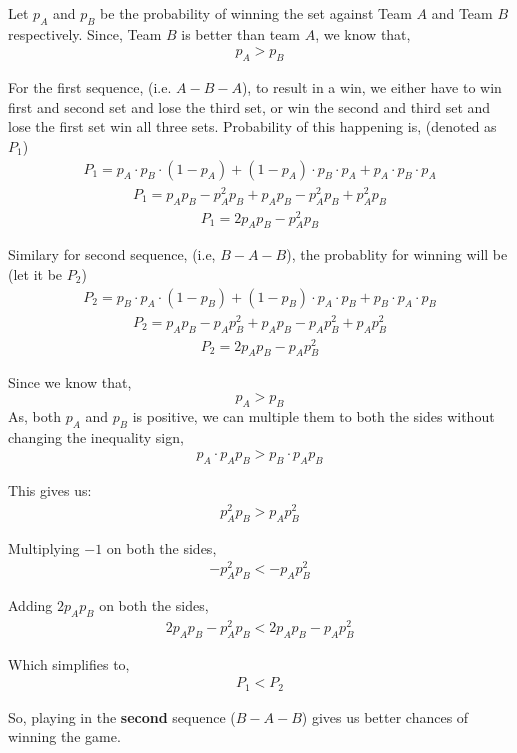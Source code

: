 \begin{tcolorbox}[breakable]
	\begin{sol}
		Let $p_A$ and $p_B$ be the probability of winning the set
		against Team $A$ and Team $B$ respectively. Since, Team $B$ is
		better than team $A$, we know that,
		\begin{align}
			p_A>p_B
		\end{align}

		For the first sequence, (i.e. $A-B-A$), to result in a win, we
		either have to win first and second set and lose the third set,
		or win the second and third set and lose the first set win all
		three sets. Probability of this happening is, (denoted as
		$P_1$)
		\begin{align}
			P_1=p_A\cdot p_B \cdot (1-p_A)+(1-p_A)\cdot p_B\cdot p_A +p_A\cdot p_B\cdot p_A
		\end{align}
		\begin{align}
			P_1=p_Ap_B-p_A^2p_B+p_Ap_B-p_A^2p_B+p_A^2p_B
		\end{align}
		\begin{align}
			P_1=2p_Ap_B-p_A^2p_B
		\end{align}

		Similary for second sequence, (i.e, $B-A-B$), the probablity for
		winning will be (let it be $P_2$)
		\begin{align}
			P_2=p_B\cdot p_A \cdot (1-p_B)+(1-p_B)\cdot p_A\cdot p_B +p_B\cdot p_A\cdot p_B
		\end{align}
		\begin{align}
			P_2=p_Ap_B-p_Ap_B^2+p_Ap_B-p_Ap_B^2+p_Ap_B^2
		\end{align}
		\begin{align}
			P_2=2p_Ap_B-p_Ap_B^2
		\end{align}

		Since we know that,
		\[p_A>p_B\]
		As, both $p_A$ and $p_B$ is positive, we can multiple them to
		both the sides without changing the inequality sign,
		\begin{align}
			p_A\cdot p_Ap_B > p_B\cdot p_Ap_B
		\end{align}

		This gives us:
		\begin{align}
			p_A^2p_B > p_Ap_B^2
		\end{align}

		Multiplying $-1$ on both the sides,
		\begin{align}
			-p_A^2p_B < -p_Ap_B^2
		\end{align}

		Adding $2p_Ap_B$ on both the sides,
		\begin{align}
			2p_Ap_B-p_A^2p_B < 2p_Ap_B-p_Ap_B^2
		\end{align}

		Which simplifies to,
		\begin{align}
			P_1 < P_2
		\end{align}

		So, playing in the \textbf{second} sequence ($B-A-B$) gives us
		better chances of winning the game.
	\end{sol}
\end{tcolorbox}
